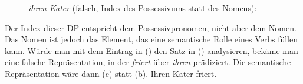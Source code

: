 \begin{figure}
\eas
\textit{ihren Kater} (falsch, Index des Possessivums statt des Nomens):\\
\zs
\vspace{-\baselineskip}
\end{figure}
Der Index dieser DP entspricht dem Possessivpronomen, nicht aber dem Nomen.
Das Nomen ist jedoch das Element, das eine semantische Rolle eines Verbs füllen kann.
Würde man mit dem Eintrag in () den Satz in () analysieren,
bekäme man eine falsche Repräsentation, in der \emph{friert} über \emph{ihren}
prädiziert. Die semantische Repräsentation wäre dann (c) statt (b).
\eal
\ex Ihren Kater friert.
\ex {}   
\ex  {}   
\zl

